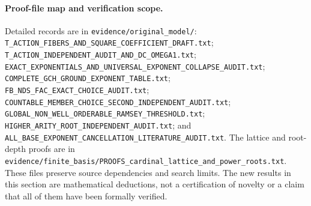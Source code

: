 \paragraph{Proof-file map and verification scope.}
Detailed records are in \nolinkurl{evidence/original_model/}:
\nolinkurl{T_ACTION_FIBERS_AND_SQUARE_COEFFICIENT_DRAFT.txt};
\nolinkurl{T_ACTION_INDEPENDENT_AUDIT_AND_DC_OMEGA1.txt};
\nolinkurl{EXACT_EXPONENTIALS_AND_UNIVERSAL_EXPONENT_COLLAPSE_AUDIT.txt};
\nolinkurl{COMPLETE_GCH_GROUND_EXPONENT_TABLE.txt};
\nolinkurl{FB_NDS_FAC_EXACT_CHOICE_AUDIT.txt};
\nolinkurl{COUNTABLE_MEMBER_CHOICE_SECOND_INDEPENDENT_AUDIT.txt};
\nolinkurl{GLOBAL_NON_WELL_ORDERABLE_RAMSEY_THRESHOLD.txt};
\nolinkurl{HIGHER_ARITY_ROOT_INDEPENDENT_AUDIT.txt}; and
\nolinkurl{ALL_BASE_EXPONENT_CANCELLATION_LITERATURE_AUDIT.txt}.
The lattice and root-depth proofs are in
\nolinkurl{evidence/finite_basis/PROOFS_cardinal_lattice_and_power_roots.txt}.
These files preserve source dependencies and search limits. The new results
in this section are mathematical deductions, not a certification of
novelty or a claim that all of them have been formally verified.
